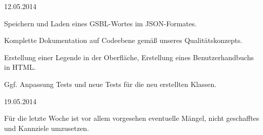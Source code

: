 \begin{release}{12.05.2014}

%
Speichern und Laden eines GSBL-Wortes im JSON-Formates.

%
Komplette Dokumentation auf Codeebene gemäß unseres Qualitätskonzepts.

%
Erstellung einer Legende in der Oberfläche, Erstellung eines Benutzerhandbuchs in HTML.

%
Ggf. Anpassung Tests und neue Tests für die neu erstellten Klassen.
\end{release}


\begin{release}{19.05.2014}

%
Für die letzte Woche ist vor allem vorgesehen eventuelle Mängel, nicht geschafftes und Kannziele umzusetzen.
\end{release}


